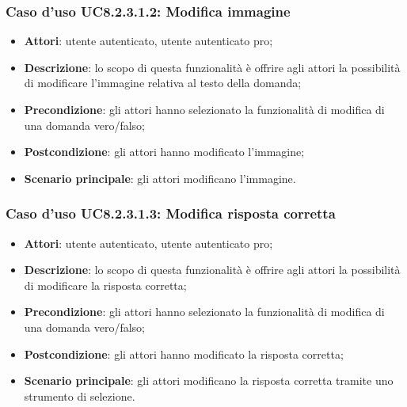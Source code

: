 \subsubsection{Caso d'uso UC8.2.3.1.2: Modifica immagine}
	\begin{itemize}
		\item
			\textbf{Attori}: utente autenticato, utente autenticato pro;
		\item		
			\textbf{Descrizione}: lo scopo di questa funzionalità è offrire agli attori la possibilità di modificare l'immagine relativa al testo della domanda;
		\item
			\textbf{Precondizione}: gli attori hanno selezionato la funzionalità di modifica di una domanda vero/falso; 
		\item
			\textbf{Postcondizione}: gli attori hanno modificato l'immagine;
		\item
			\textbf{Scenario principale}: gli attori modificano l'immagine. 	
	\end{itemize}
	
\subsubsection{Caso d'uso UC8.2.3.1.3: Modifica risposta corretta}
	\begin{itemize}
		\item
			\textbf{Attori}: utente autenticato, utente autenticato pro;
		\item		
			\textbf{Descrizione}: lo scopo di questa funzionalità è offrire agli attori la possibilità di modificare la risposta corretta;
		\item
			\textbf{Precondizione}: gli attori hanno selezionato la funzionalità di modifica di una domanda vero/falso; 
		\item
			\textbf{Postcondizione}: gli attori hanno modificato la risposta corretta;
		\item
			\textbf{Scenario principale}: gli attori modificano la risposta corretta tramite uno strumento di selezione. 
	 			
	\end{itemize}
	